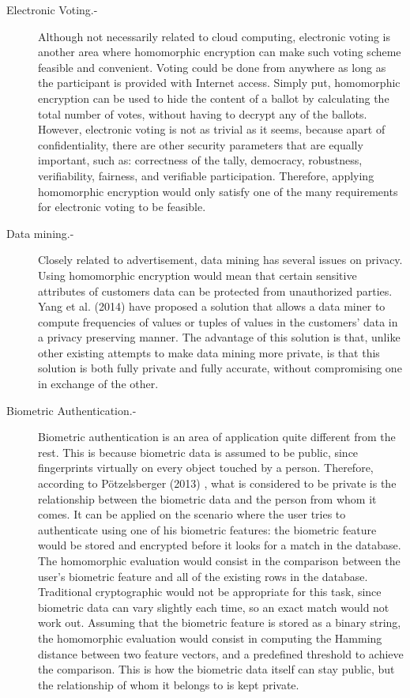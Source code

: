 \begin{description}
\item[Electronic Voting.-] Although not necessarily related to cloud computing, electronic voting is another area where homomorphic encryption can make such voting scheme feasible and convenient. Voting could be done from anywhere as long as the participant is provided with Internet access. Simply put, homomorphic encryption can be used to hide the content of a ballot by calculating the total number of votes, without having to decrypt any of the ballots. However, electronic voting is not as trivial as it seems, because apart of confidentiality, there are other security parameters that are equally important, such as: correctness of the tally, democracy, robustness, verifiability, fairness, and verifiable participation. Therefore, applying homomorphic encryption would only satisfy one of the many requirements for electronic voting to be feasible.
\item[Data mining.-] Closely related to advertisement, data mining has several issues on privacy. Using homomorphic encryption would mean that certain sensitive attributes of customers data can be protected from unauthorized parties. Yang et al. (2014) \cite{YangZhongWright} have proposed a solution that allows a data miner to compute frequencies of values or tuples of values in the customers' data in a privacy preserving manner. The advantage of this solution is that, unlike other existing attempts to make data mining more private, is that this solution is both fully private and fully accurate, without compromising one in exchange of the other.
\item[Biometric Authentication.-] Biometric authentication is an area of application quite different from the rest. This is because biometric data is assumed to be public, since fingerprints virtually on every object touched by a person. Therefore, according to P{\"o}tzelsberger (2013) \cite{potzelsberger2013kv}, what is considered to be private is the relationship between the biometric data and the person from whom it comes. It can be applied on the scenario where the user tries to authenticate using one of his biometric features: the biometric feature would be stored and encrypted before it looks for a match in the database. The homomorphic evaluation would consist in the comparison between the user's biometric feature and all of the existing rows in the database. Traditional cryptographic would not be appropriate for this task, since biometric data can vary slightly each time, so an exact match would not work out. Assuming that the biometric feature is stored as a binary string, the homomorphic evaluation would consist in computing the Hamming distance between two feature vectors, and a predefined threshold to achieve the comparison. This is how the biometric data itself can stay public, but the relationship of whom it belongs to is kept private.
\end{description}

